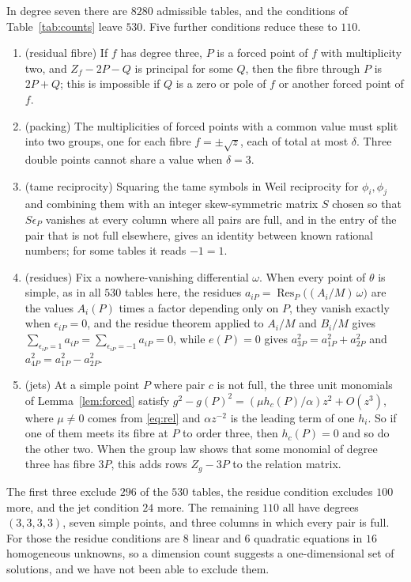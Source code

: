 \documentclass[11pt]{amsart}
\theoremstyle{definition}
\newcommand{\Res}{\operatorname{Res}}
\begin{document}
In degree seven there are $8280$ admissible tables, and the conditions of Table~\ref{tab:counts} leave $530$. Five
further conditions reduce these to $110$.

\begin{enumerate}
\item (residual fibre) If $f$ has degree three, $P$ is a forced point of $f$ with multiplicity two, and
$Z_f-2P-Q$ is principal for some $Q$, then the fibre through $P$ is $2P+Q$; this is impossible if $Q$ is a zero or
pole of $f$ or another forced point of $f$.
\item (packing) The multiplicities of forced points with a common value must split into two groups, one for each
fibre $f=\pm\sqrt z$, each of total at most $\delta$. Three double points cannot share a value when $\delta=3$.
\item (tame reciprocity) Squaring the tame symbols in Weil reciprocity for $\phi_i,\phi_j$ and combining them with an
integer skew-symmetric matrix $S$ chosen so that $S\epsilon_P$ vanishes at every column where all pairs are full, and
in the entry of the pair that is not full elsewhere, gives an identity between known rational numbers; for some
tables it reads $-1=1$.
\item (residues) Fix a nowhere-vanishing differential $\omega$. When every point of $\theta$ is simple, as in all $530$
tables here, the residues $a_{iP}=\Res_P\big((A_i/M)\,\omega\big)$ are the values $A_i(P)$ times a factor depending only on $P$, they vanish exactly when
$\epsilon_{iP}=0$, and the residue theorem applied to $A_i/M$ and $B_i/M$ gives
$\sum_{\epsilon_{iP}=1}a_{iP}=\sum_{\epsilon_{iP}=-1}a_{iP}=0$, while $e(P)=0$ gives $a_{3P}^2=a_{1P}^2+a_{2P}^2$ and
$a_{4P}^2=a_{1P}^2-a_{2P}^2$.
\item (jets) At a simple point $P$ where pair $c$ is not full, the three unit monomials of Lemma~\ref{lem:forced}
satisfy $g^2-g(P)^2=(\mu h_c(P)/\alpha)z^2+O(z^3)$, where $\mu\ne0$ comes from \eqref{eq:rel} and $\alpha z^{-2}$ is
the leading term of one $h_i$. So if one of them meets its fibre at $P$ to order three, then $h_c(P)=0$ and so do the
other two. When the group law shows that some monomial of degree three has fibre $3P$, this adds rows $Z_g-3P$ to the
relation matrix.
\end{enumerate}
The first three exclude $296$ of the $530$ tables, the residue condition excludes $100$ more, and the jet condition
$24$ more. The remaining $110$ all have degrees $(3,3,3,3)$, seven simple points, and three columns in which every pair is full. For those the
residue conditions are $8$ linear and $6$ quadratic equations in $16$ homogeneous unknowns, so a dimension count
suggests a one-dimensional set of solutions, and we have not been able to exclude them.
\end{document}
